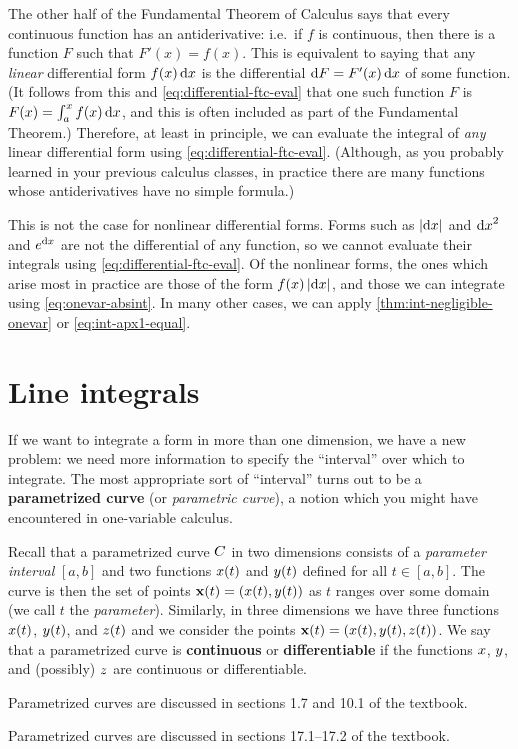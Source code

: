 \documentclass[12pt]{amsart}
\begin{document}
The other half of the Fundamental Theorem of Calculus says that every continuous function has an antiderivative: i.e.\ if $f$ is continuous, then there is a function $F$ such that $F'(x) = f(x)$.
This is equivalent to saying that any \emph{linear} differential form $f(x)\,{\mathrm{d} x}$ is the differential $\mathrm{d} F = F'(x)\,{\mathrm{d} x}$ of some function.
(It follows from this and \cref{eq:differential-ftc-eval} that one such function $F$ is $F(x)= \int_a^x f(x)\,{\mathrm{d} x}$, and this is often included as part of the Fundamental Theorem.)
Therefore, at least in principle, we can evaluate the integral of \emph{any} linear differential form using \cref{eq:differential-ftc-eval}.
(Although, as you probably learned in your previous calculus classes, in practice there are many functions whose antiderivatives have no simple formula.)

This is not the case for nonlinear differential forms.
Forms such as $|{\mathrm{d} x}|$ and ${\mathrm{d} x}^2$ and $e^{\mathrm{d} x}$ are not the differential of any function, so we cannot evaluate their integrals using \cref{eq:differential-ftc-eval}.
Of the nonlinear forms, the ones which arise most in practice are those of the form $f(x)\,|{\mathrm{d} x}|$, and those we can integrate using \cref{eq:onevar-absint}.
In many other cases, we can apply \cref{thm:int-negligible-onevar} or \cref{eq:int-apx1-equal}.


\section{Line integrals}
\label{sec:line-integrals}

If we want to integrate a form in more than one dimension, we have a new problem: we need more information to specify the ``interval'' over which to integrate.
The most appropriate sort of ``interval'' turns out to be a \textbf{parametrized curve} (or \emph{parametric curve}), a notion which you might have encountered in one-variable calculus.

Recall that a parametrized curve $C$ in two dimensions consists of a \emph{parameter interval} $[a,b]$ and two functions $x(t)$ and $y(t)$ defined for all $t\in [a,b]$.
The curve is then the set of points $\mathbf{x}(t) = (x(t),y(t))$ as $t$ ranges over some domain (we call $t$ the \emph{parameter}).
Similarly, in three dimensions we have three functions $x(t)$, $y(t)$, and $z(t)$ and we consider the points $\mathbf{x}(t) = (x(t),y(t),z(t))$.
We say that a parametrized curve is \textbf{continuous} or \textbf{differentiable} if the functions $x$, $y$, and (possibly) $z$ are continuous or differentiable.
\begin{stewart}Parametrized curves are discussed in sections 1.7 and 10.1 of the textbook.\end{stewart}%
\begin{hugheshallett}Parametrized curves are discussed in sections 17.1--17.2 of the textbook.\end{hugheshallett}
\end{document}
